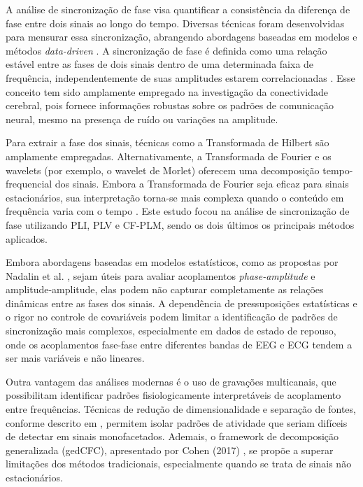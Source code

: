 A análise de sincronização de fase visa quantificar a consistência da diferença de fase entre dois sinais ao longo do tempo. Diversas técnicas foram desenvolvidas para mensurar essa sincronização, abrangendo abordagens baseadas em modelos e métodos \textit{data-driven} \cite{seraj2018cerebral}. A sincronização de fase é definida como uma relação estável entre as fases de dois sinais dentro de uma determinada faixa de frequência, independentemente de suas amplitudes estarem correlacionadas \cite{seraj2018cerebral}. Esse conceito tem sido amplamente empregado na investigação da conectividade cerebral, pois fornece informações robustas sobre os padrões de comunicação neural, mesmo na presença de ruído ou variações na amplitude.

Para extrair a fase dos sinais, técnicas como a Transformada de Hilbert são amplamente empregadas. Alternativamente, a Transformada de Fourier e os wavelets (por exemplo, o wavelet de Morlet) oferecem uma decomposição tempo-frequencial dos sinais. Embora a Transformada de Fourier seja eficaz para sinais estacionários, sua interpretação torna-se mais complexa quando o conteúdo em frequência varia com o tempo \cite{singh2024evaluating}. Este estudo focou na análise de sincronização de fase utilizando PLI, PLV e CF-PLM, sendo os dois últimos os principais métodos aplicados.

Embora abordagens baseadas em modelos estatísticos, como as propostas por Nadalin et al. \cite{nadalin2019statistical}, sejam úteis para avaliar acoplamentos \textit{phase-amplitude} e amplitude-amplitude, elas podem não capturar completamente as relações dinâmicas entre as fases dos sinais. A dependência de pressuposições estatísticas e o rigor no controle de covariáveis podem limitar a identificação de padrões de sincronização mais complexos, especialmente em dados de estado de repouso, onde os acoplamentos fase-fase entre diferentes bandas de EEG e ECG tendem a ser mais variáveis e não lineares.

Outra vantagem das análises modernas é o uso de gravações multicanais, que possibilitam identificar padrões fisiologicamente interpretáveis de acoplamento entre frequências. Técnicas de redução de dimensionalidade e separação de fontes, conforme descrito em \cite{cohen2017multivariate}, permitem isolar padrões de atividade que seriam difíceis de detectar em sinais monofacetados. Ademais, o framework de decomposição generalizada (gedCFC), apresentado por Cohen (2017) \cite{cohen2017multivariate}, se propõe a superar limitações dos métodos tradicionais, especialmente quando se trata de sinais não estacionários.

